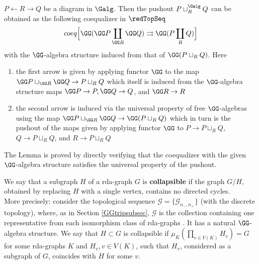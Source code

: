 \documentclass[a4paper,10pt]{amsart}
\begin{document}
\begin{lemma}\label{pushoutlem}
	$P \leftarrow R \to Q$ be a diagram in $\Galg$. Then the pushout $P \sqcup_{R}^{\Galg} Q$ can be obtained as the following coequalizer in $\redTopSeq$
	\[ coeq\Big[ \GG(\GG P \coprod_{\GG R} \GG Q) \rightrightarrows \GG(P \coprod_{R} Q) \Big] \]
	with the $\GG$-algebra structure induced from that of $\GG(P \sqcup_{R} Q)$. Here 
	\begin{enumerate}
	\item the first arrow is given by applying functor $\GG$ to the map $ \GG P \sqcup_{\GG R} \GG Q \to P \sqcup_{R} Q$ which itself is induced from the $\GG$-algebra structure maps $\GG P \to P, \GG Q \to Q$, and $\GG R \to R$
	\item the second arrow is induced via the universal property of free $\GG$-algebras using the map $ \GG P \sqcup_{\GG R} \GG Q \to \GG(P \sqcup_{R} Q) $ which in turn is the pushout of the maps given by applying functor $\GG$ to $P \to P \sqcup_R Q$, $Q \to P \sqcup_R Q$, and $R \to P \sqcup_R Q$
	\end{enumerate}
\end{lemma}
The Lemma is proved by directly verifying that the coequalizer with the given $\GG$-algebra structure satisfies the universal property of the pushout.

\begin{notation} 
	We say that a subgraph $H$ of a rda-graph $G$ is \textbf{collapsible} if the graph $G/H$, obtained by replacing $H$ with a single vertex, contains no directed cycles.\\	
	More precisely: consider the topological sequence $\mathcal{G}= \{\mathcal{G}_{n_-,n_+}\}$ (with the discrete topology), where, as in Section \ref{GGtripsubsec}, $\mathcal{G}$ is the collection containing one representative from each isomorphism class of rda-graphs . It has a natural $\GG$-algebra structure. We say that $H \subset G$ is collapsible if $\mu_K(\prod_{v \in V(K)} H_v ) = G$ for some rda-graphs $K$ and $H_{v}, v \in V(K)$, such that $H_v$, considered as a subgraph of $G$, coincides with $H$ for some $v$.
\end{notation}
\end{document}
